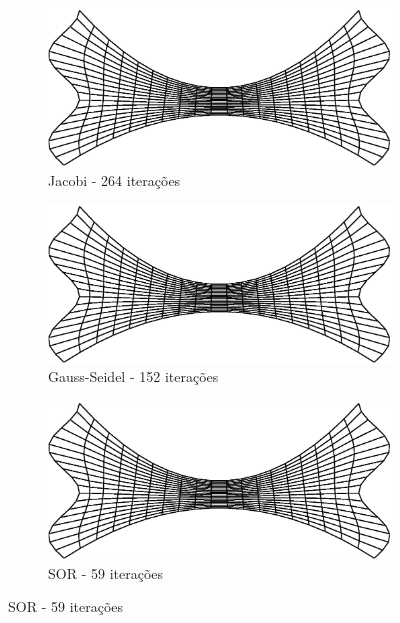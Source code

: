 \documentclass{article}
\begin{document}
		\begin{figure}
		\centering
			\begin{subfigure}[b]{0.45\textwidth}
				\centering
				\includegraphics[width=\textwidth]{figures/waves-jacobi.eps}
				\caption{Jacobi - 264 iterações}
			\end{subfigure}
			\begin{subfigure}[b]{0.45\textwidth}
				\centering
				\includegraphics[width=\textwidth]{figures/waves-gauss.eps}
				\caption{Gauss-Seidel - 152 iterações}
			\end{subfigure}
			\begin{subfigure}[b]{0.45\textwidth}
				\centering
				\includegraphics[width=\textwidth]{figures/waves-sor.eps}
				\caption{SOR - 59 iterações}
			\end{subfigure}

\end{figure}
\end{document}

